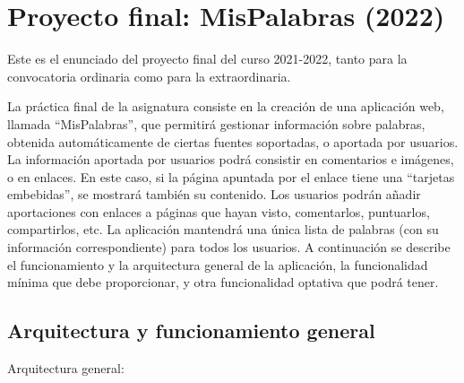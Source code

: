 \section{Proyecto final: MisPalabras (2022)}
\label{practica-final-2022-05}


Este es el enunciado del proyecto final del curso 2021-2022, tanto para la convocatoria ordinaria como para la extraordinaria.

La práctica final de la asignatura consiste en la creación de una aplicación web, llamada ``MisPalabras'', que permitirá gestionar información sobre palabras, obtenida automáticamente de ciertas fuentes soportadas, o aportada por usuarios. La información aportada por usuarios podrá consistir en comentarios e imágenes, o en enlaces. En este caso, si la página apuntada por el enlace tiene una ``tarjetas embebidas'', se mostrará también su contenido. Los usuarios podrán añadir aportaciones con enlaces a páginas que hayan visto, comentarlos, puntuarlos, compartirlos, etc. La aplicación mantendrá una única lista de palabras (con su información correspondiente) para todos los usuarios. A continuación se describe el funcionamiento y la arquitectura general de la aplicación, la funcionalidad mínima que debe proporcionar, y otra funcionalidad optativa que podrá tener.

\subsection{Arquitectura y funcionamiento general}

Arquitectura general:

